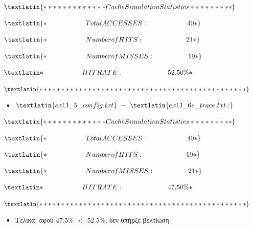 \documentclass{article}
\begin{document}
$
\textlatin
{
************* Cache Simulation Statistics *********
}
$

$
\textlatin
{
* \hspace{2cm}            Total ACCESSES :  \hspace{2.02cm}               40 *
}
$

$
\textlatin
{
*     \hspace{2cm}        Number of HITS :        \hspace{2.2cm}         21 *
}
$

$
\textlatin
{
*       \hspace{2cm}      Number of MISSES :        \hspace{1.75cm}       19 *
}
$

$
\textlatin
{
*      \hspace{2cm}       HIT RATE :          \hspace{2.3cm}         52.50\% *
}
$

$
\textlatin
{
***********************************************
}
$

\begin{itemize}
    \item $\textlatin{ex11\_5\_config.txt} \ - \ \textlatin{ex11\_6e\_trace.txt:}$
\end{itemize}

$
\textlatin
{
************* Cache Simulation Statistics *********
}
$

$
\textlatin
{
* \hspace{2cm}            Total ACCESSES :  \hspace{2.02cm}               40 *
}
$

$
\textlatin
{
*     \hspace{2cm}        Number of HITS :        \hspace{2.2cm}         19 *
}
$

$
\textlatin
{
*       \hspace{2cm}      Number of MISSES :        \hspace{1.75cm}       21 *
}
$

$
\textlatin
{
*      \hspace{2cm}       HIT RATE :          \hspace{2.3cm}         47.50\% *
}
$

$
\textlatin
{
***********************************************
}
$

\begin{itemize}
    \item Τελικά, αφού 47.5\% $<$ 52.5\%, δεν υπήρξε βελτίωση.
\end{itemize}
\end{document}
